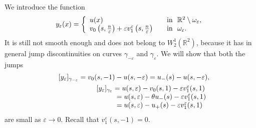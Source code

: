 \documentclass[graybox]{svmult}
\renewcommand{\kappa}{\varkappa}
\newcommand{\Real}{\mathbb R}
\newcommand{\eps}{\varepsilon}
\renewcommand{\leq}{\leqslant}
\newcommand\nep{\textstyle\frac n\eps}
\newcommand{\eqref}[1]{(\ref{#1})}
\begin{document}
%


We introduce the function
\begin{equation}\label{ApproxWe}
y_\eps(x)=
\left\{
  \begin{array}{ll}
    u(x)&\quad \hbox{in \ }\Real^2\setminus \omega_\eps, \\
    v_0\left(s,\nep\right)+\eps v_1^\eps\left(s,\nep\right)
&\quad \hbox{in \ } \omega_\eps.
  \end{array}
\right.
\end{equation}
It is still not smooth enough and does not belong to $W_2^1(\Real^2)$, because it has  in general  jump discontinuities on curves  $\gamma_{-\eps}$ and $\gamma_\eps$.
We will show  that both the jumps
\begin{eqnarray}\nonumber
&&[y_\eps]_{\gamma_{-\eps}}=v_0(s,-1)-u(s,-\eps)=u_-(s)-u(s,-\eps),\\\nonumber
&&
\begin{array}{l}
[y_\eps]_{\gamma_{\eps}}=u(s,\eps)-v_0(s,1)-\eps v_1^\eps(s,1)\\
\kern29pt=u(s,\eps)-\theta u_-(s)-\eps v_1^\eps(s,1)\\\nonumber
\kern29pt=
u(s,\eps)- u_+(s)-\eps v_1^\eps(s,1)
\end{array}
\end{eqnarray}
are small as $\eps\to 0$.
Recall that $v_1^\eps(s,-1)=0$.
\end{document}

